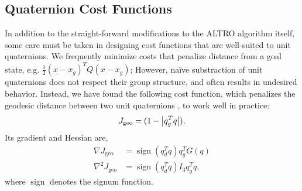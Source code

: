 \documentclass[letterpaper, 10 pt, conference]{ieeeconf}  %
\newcommand{\half}{\frac{1}{2}}
\DeclareMathOperator{\sign}{sign}
\begin{document}
    \subsection{Quaternion Cost Functions} \label{sec:cost_functions}
        In addition to the straight-forward modifications to the ALTRO algorithm itself, some care must be taken in designing cost functions that are well-suited to unit quaternions. We
        frequently minimize costs that penalize distance from a goal state, e.g. $\half
        (x-x_g)^T Q (x-x_g)$; However, na\"ive substraction of unit quaternions does not respect their group structure, and often results in undesired behavior. Instead, we have found the following cost function, which penalizes the geodesic
        distance between two unit quaternions \cite{Kuffner2004}, to work well in practice:
        \begin{equation} \label{eq:quat_geodesic}
            J_\text{geo} = (1-\abs{q_g^T q}) .
        \end{equation}
        Its gradient and Hessian are,
        \begin{align}
            \nabla J_\text{geo} &= \sign(q_d^T q) q_g^T G(q) \\
            \nabla^2 J_\text{geo} &= \sign(q_d^T q) I_3 q_g^T q ,
        \end{align}
        where $\sign$ denotes the signum function.
        
\end{document}
